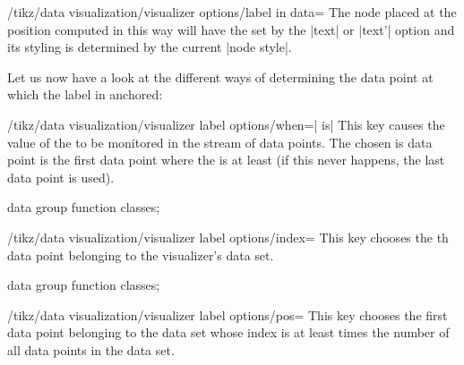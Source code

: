 \begin{key}{/tikz/data visualization/visualizer options/label in data=}
    The node placed at the position computed in this way will have the
     set by the |text| or |text'| option and its styling is
    determined by the current |node style|.

    Let us now have a look at the different ways of determining the data point
    at which the label in anchored:
    \begin{key}{/tikz/data visualization/visualizer label options/when=| is|}
        This key causes the value of the  to be monitored in
        the stream of data points. The chosen is data point is the first data
        point where the  is at least  (if this
        never happens, the last data point is used).
\begin{codeexample}[width=6.3cm]
\tikz \datavisualization [
  school book axes,
  x axis={label=$x$},
  visualize as smooth line/.list={log, lin, squared, exp},
  log=    {label in data={text'=$\log x$, when=y is -1,
                          text colored}},
  lin=    {label in data={text=$x/2$,     when=x is 2}},
  squared={label in data={text=$x^2$,     when=x is 1.1}},
  exp=    {label in data={text=$e^x$,     when=x is -2,
                          text colored}},
  style sheet=vary hue]
data group {function classes};
\end{codeexample}
    \end{key}
    \begin{key}{/tikz/data visualization/visualizer label options/index=}
        This key chooses the th data point belonging to the
        visualizer's data set.
\begin{codeexample}[width=6.3cm]
\tikz \datavisualization [
  school book axes,
  x axis={label=$x$},
  visualize as smooth line/.list={exp},
  exp=    {label in data={text=$5$, index=5},
           label in data={text=$10$, index=10},
           label in data={text=$20$, index=20},
           style={mark=x}},
  style sheet=vary hue]
data group {function classes};
\end{codeexample}
    \end{key}
    \begin{key}{/tikz/data visualization/visualizer label options/pos=}
        This key chooses the first data point belonging to the data set whose
        index is at least  times the number of all data points
        in the data set.
\begin{codeexample}[width=6.3cm]

\end{codeexample}
\end{key}
\end{key}
